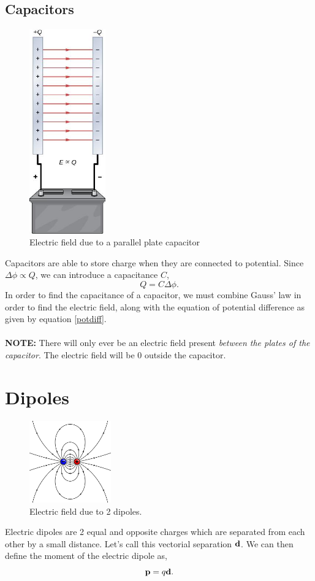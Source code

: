 \documentclass{book}
\begin{document}
\subsection{Capacitors}
\begin{figure}[h]
    \centering
    \includegraphics[height=250pt]{CNX_UPhysics_25_01_Electric.jpg}
    \caption{Electric field due to a parallel plate capacitor}
    \label{fig:capacitor}
\end{figure}
\noindent Capacitors are able to store charge when they are connected to potential. Since $\Delta \phi \propto Q$, we can introduce a capacitance $C$,
\begin{equation}
    Q = C\Delta \phi. \label{capacitance}
\end{equation}
In order to find the capacitance of a capacitor, we must combine Gauss' law in order to find the electric field, along with the equation of potential difference as given by equation \eqref{potdiff}. \\\\
\textbf{NOTE:} There will only ever be an electric field present \textit{between the plates of the capacitor}. The electric field will be 0 outside the capacitor.
\section{Dipoles}
\begin{figure}[h]
    \centering
    \includegraphics[width=100pt]{VFPt_dipole_electric.svg.png}
    \caption{Electric field due to 2 dipoles.}
    \label{fig:dipoles}
\end{figure}
Electric dipoles are 2 equal and opposite charges which are separated from each other by a small distance. Let's call this vectorial separation $\vb{d}$. We can then define the moment of the electric dipole as,
\begin{equation}
    \vb{p}= q\vb{d}.
\end{equation}
\end{document}
